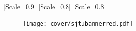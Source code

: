 
[Scale=0.9]
[Scale=0.8]
[Scale=0.8]
\newcommand{\hei}{\CJKfamily{hei}\selectfont}
\newcommand{\sun}{\CJKfamily{sun}\selectfont}
\newcommand{\pixel}{\fontspec{Fusion Pixel 12px Proportional zh_hans}\CJKfamily{pixel}\selectfont}
\vspace*{1cm}
\begin{figure}[h]
    \centering
    \texttt{[image: cover/sjtubannerred.pdf]}
\end{figure}

\vspace*{1cm}

\vspace*{0.5cm}


